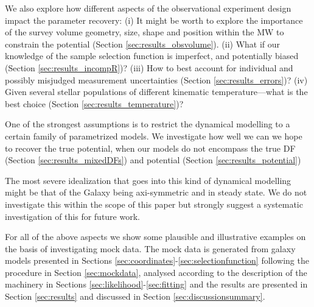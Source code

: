 We also explore how different aspects of the observational experiment design impact the parameter recovery: (i) It might be worth to explore the importance of the survey volume geometry, size, shape and position within the MW to constrain the potential (Section \ref{sec:results_obsvolume}). (ii) What if our knowledge of the sample selection function is imperfect, and potentially biased (Section \ref{sec:results_incompR})? (iii) How to best account for individual and possibly misjudged measurement uncertainties (Section \ref{sec:results_errors})? (iv) Given several stellar populations of different kinematic temperature---what is the best choice (Section \ref{sec:results_temperature})? 

One of the strongest assumptions is to restrict the dynamical modelling to a certain family of parametrized models. We investigate how well we can we hope to recover the true potential, when our models do not encompass the true DF (Section \ref{sec:results_mixedDFs}) and potential (Section \ref{sec:results_potential})

The most severe idealization that goes into this kind of dynamical modelling might be that of the Galaxy being axi-symmetric and in steady state. We do not investigate this within the scope of this paper but strongly suggest a systematic investigation of this for future work.

For all of the above aspects we show some plausible and illustrative examples on the basis of investigating mock data. The mock data is generated from galaxy models presented in Sections \ref{sec:coordinates}-\ref{sec:selectionfunction} following the procedure in Section \ref{sec:mockdata}, analysed according to the description of the \RM{} machinery in Sections \ref{sec:likelihood}-\ref{sec:fitting} and the results are presented in Section \ref{sec:results} and discussed in Section \ref{sec:discussionsummary}.

